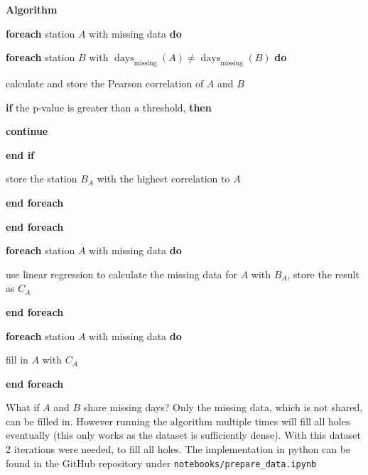 \documentclass{article}
\newcommand{\tmop}[1]{\ensuremath{\operatorname{#1}}}
\newcommand{\tmstrong}[1]{\textbf{#1}}
\newcommand{\tmtextup}[1]{\text{{\upshape{#1}}}}
\newenvironment{tmindent}{\begin{tmparmod}{1.5em}{0pt}{0pt}}{\end{tmparmod}}
\newenvironment{tmparmod}[3]{\begin{list}{}{\setlength{\topsep}{0pt}\setlength{\leftmargin}{#1}\setlength{\rightmargin}{#2}\setlength{\parindent}{#3}\setlength{\listparindent}{\parindent}\setlength{\itemindent}{\parindent}\setlength{\parsep}{\parskip}} \item[]}{\end{list}}
\newenvironment{tmparsep}[1]{\begingroup\setlength{\parskip}{#1}}{\endgroup}
\newcounter{tmcounter}
\newcommand{\custombinding}[1]{%
  \setcounter{tmcounter}{#1}%
  \addtocounter{tmcounter}{-1}%
  \refstepcounter{tmcounter}}
\begin{document}
\custombinding{1}{\noindent}\begin{tmparmod}{0pt}{0pt}{0em}%
  \begin{tmparsep}{0em}%
    {\tmstrong{Algorithm \tmtextup{1}}}{\smallskip}
    
    \begin{tmindent}
      {\tmstrong{foreach}} station $A$ with missing data {\tmstrong{do}}
      \begin{tmindent}
        {\tmstrong{foreach}} station $B$ with $\tmop{days}_{\tmop{missing}}
        (A) \neq \tmop{days}_{\tmop{missing}} (B)$ {\tmstrong{do}}
        \begin{tmindent}
          calculate and store the Pearson correlation of $A$ and $B$
          
          {\tmstrong{if}} the p-value is greater than a threshold,
          {\tmstrong{then}}
          \begin{tmindent}
            {\tmstrong{continue}}
          \end{tmindent}
          {\tmstrong{end if}}
          
          store the station $B_A$ with the highest correlation to $A$
        \end{tmindent}
        {\tmstrong{end foreach}}
      \end{tmindent}
      {\tmstrong{end foreach}}
      
      {\tmstrong{foreach}} station $A$ with missing data {\tmstrong{do}}
      \begin{tmindent}
        use linear regression to calculate the missing data for $A$ with
        $B_A$, store the result as $C_A$
      \end{tmindent}
      {\tmstrong{end foreach}}
      
      {\tmstrong{foreach}} station $A$ with missing data {\tmstrong{do}}
      \begin{tmindent}
        fill in $A$ with $C_A$
      \end{tmindent}
      {\tmstrong{end foreach}}
    \end{tmindent}
  \end{tmparsep}
\end{tmparmod}{\medskip}

What if $A$ and $B$ share missing days? Only the missing data, which is not
shared, can be filled in. However running the algorithm multiple times will
fill all holes eventually (this only works as the dataset is sufficiently
dense). With this dataset 2 iterations were needed, to fill all holes.
The implementation in python can be found in the GitHub repository under \texttt{notebooks/prepare\_data.ipynb}
\end{document}
